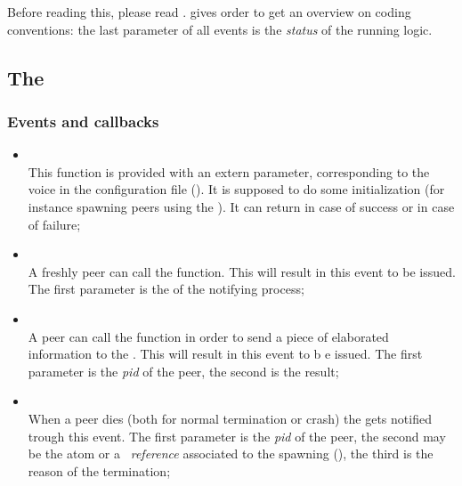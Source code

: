 Before reading this, please read .
 gives order to get an overview on
coding conventions: the last parameter of all events is the \emph{status}
of the running logic.

\subsection{The  }

    \subsubsection{Events and callbacks}

        \begin{itemize}
        \item {} \\
            This function is provided with an extern parameter,
            corresponding to the  voice in the
            configuration file ().
            It is supposed to do some initialization (for instance
            spawning peers using the ).
            It can return  in case of success or
             in case of failure;

        \item {} \\
            A freshly peer can call the 
            function. This will result in this event to be issued. The
            first parameter is the  of the notifying process;

        \item {} \\
            A peer can call the 
            function in order to send a piece of elaborated information to
            the . This will result in this event to b e
            issued. The first parameter is the \emph{pid} of the
            peer, the second is the result;

        \item {} \\
            When a peer dies (both for normal termination or crash) the
             gets notified trough this event. The first
            parameter is the \emph{pid} of the peer, the second may be the
             atom or a \emph{\Erlang\ reference}
            associated to the spawning (), the
            third is the reason of the termination;


\end{itemize}
